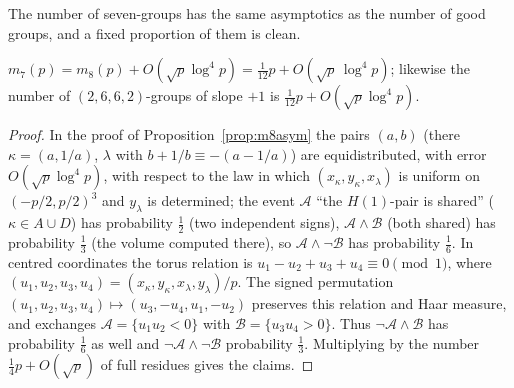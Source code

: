 The number of seven-groups has the same asymptotics as the number of good groups, and a fixed proportion of them is clean.

\begin{proposition}\label{prop:m7asym}
$m_7(p)=m_8(p)+O(\sqrt p\log^4p)=\tfrac1{12}p+O(\sqrt p\,\log^4p)$; likewise the number of $(2,6,6,2)$-groups of slope $+1$ is
$\tfrac1{12}p+O(\sqrt p\log^4p)$.
\end{proposition}
\begin{proof}
In the proof of Proposition~\ref{prop:m8asym} the pairs $(a,b)$ (there $\kappa=(a,1/a)$, $\lambda$ with $b+1/b\equiv-(a-1/a)$) are
equidistributed, with error $O(\sqrt p\log^4p)$, with respect to the law in which $(x_\kappa,y_\kappa,x_\lambda)$ is uniform on
$(-p/2,p/2)^3$ and $y_\lambda$ is determined; the event $\mathcal A$ ``the $H(1)$-pair is shared'' ($\kappa\in A\cup D$) has probability
$\tfrac12$ (two independent signs), $\mathcal A\wedge\mathcal B$ (both shared) has probability $\tfrac13$ (the volume computed there), so
$\mathcal A\wedge\neg\mathcal B$ has probability $\tfrac16$.  In centred coordinates the torus relation is
$u_1-u_2+u_3+u_4\equiv0\pmod1$, where $(u_1,u_2,u_3,u_4)=(x_\kappa,y_\kappa,x_\lambda,y_\lambda)/p$.
The signed permutation $(u_1,u_2,u_3,u_4)\mapsto(u_3,-u_4,u_1,-u_2)$ preserves this relation and Haar measure,
and exchanges $\mathcal A=\{u_1u_2<0\}$ with $\mathcal B=\{u_3u_4>0\}$.  Thus $\neg\mathcal A\wedge\mathcal B$ has probability $\tfrac16$
as well and $\neg\mathcal A\wedge\neg\mathcal B$ probability $\tfrac13$.  Multiplying by the number $\tfrac14p+O(\sqrt p)$ of full residues
gives the claims.
\end{proof}

